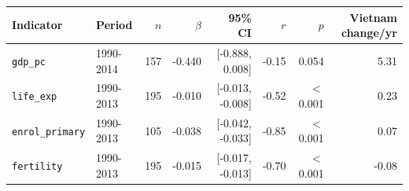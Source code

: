 \small
\begin{tabular}{llrrrrrr}
\toprule
Indicator & Period & $n$ & $\beta$ & 95\% CI & $r$ & $p$ & Vietnam change/yr \\
\midrule
\texttt{gdp\_pc} & 1990-2014 & 157 & -0.440 & [-0.888, 0.008] & -0.15 & 0.054 & 5.31 \\
\texttt{life\_exp} & 1990-2013 & 195 & -0.010 & [-0.013, -0.008] & -0.52 & $<$0.001 & 0.23 \\
\texttt{enrol\_primary} & 1990-2013 & 105 & -0.038 & [-0.042, -0.033] & -0.85 & $<$0.001 & 0.07 \\
\texttt{fertility} & 1990-2013 & 195 & -0.015 & [-0.017, -0.013] & -0.70 & $<$0.001 & -0.08 \\
\bottomrule
\end{tabular}
